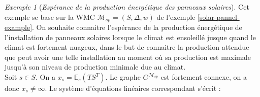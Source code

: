 \documentclass[12pt,a4paper]{report}
\theoremstyle{definition}%
\theoremstyle{remark}
\newtheorem{example}{Exemple}[chapter]
\begin{document}
\begin{example}[\textit{Espérance de la production énergétique des panneaux solaires}]
	Cet exemple se base sur la WMC $\mathcal{M}_{sp} = (S, \Delta, w)$ de l'exemple \ref{solar-pannel-example}. On souhaite connaitre l'espérance de la production énergétique de l'installation de panneaux solaires lorsque le climat est ensoleillé jusque quand le climat est fortement nuageux, dans le but de connaitre la production attendue que peut avoir une telle installation au moment où sa production est maximale jusqu'à son niveau de production minimale due au climat.\\
	Soit $s \in S$. On a $x_s = \mathbb{E}_s(TS^T)$. Le graphe $G^{\mathcal{M}_{sp}}$ est fortement connexe, on a donc $x_s \neq \infty$. Le système d'équations linéaires correspondant s'écrit :


\end{example}
\end{document}
